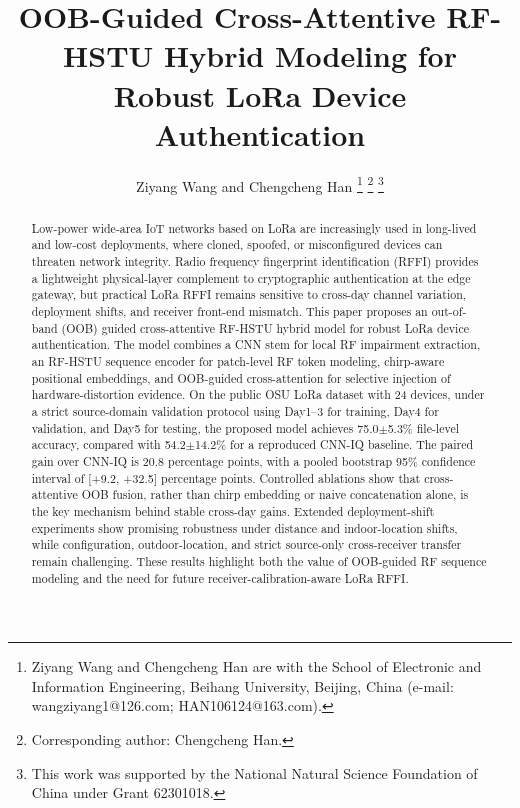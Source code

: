 \documentclass[journal]{IEEEtran}
\begin{document}
\title{OOB-Guided Cross-Attentive RF-HSTU Hybrid Modeling for Robust LoRa Device Authentication}

\author{Ziyang Wang and Chengcheng Han%
\thanks{Ziyang Wang and Chengcheng Han are with the School of Electronic and Information Engineering, Beihang University, Beijing, China (e-mail: wangziyang1@126.com; HAN106124@163.com).}
\thanks{Corresponding author: Chengcheng Han.}
\thanks{This work was supported by the National Natural Science Foundation of China under Grant 62301018.}}

\maketitle

\begin{abstract}
Low-power wide-area IoT networks based on LoRa are increasingly used in long-lived and low-cost deployments, where cloned, spoofed, or misconfigured devices can threaten network integrity.
Radio frequency fingerprint identification (RFFI) provides a lightweight physical-layer complement to cryptographic authentication at the edge gateway, but practical LoRa RFFI remains sensitive to cross-day channel variation, deployment shifts, and receiver front-end mismatch.
This paper proposes an out-of-band (OOB) guided cross-attentive RF-HSTU hybrid model for robust LoRa device authentication.
The model combines a CNN stem for local RF impairment extraction, an RF-HSTU sequence encoder for patch-level RF token modeling, chirp-aware positional embeddings, and OOB-guided cross-attention for selective injection of hardware-distortion evidence.
On the public OSU LoRa dataset with 24 devices, under a strict source-domain validation protocol using Day1--3 for training, Day4 for validation, and Day5 for testing, the proposed model achieves 75.0$\pm$5.3\% file-level accuracy, compared with 54.2$\pm$14.2\% for a reproduced CNN-IQ baseline.
The paired gain over CNN-IQ is 20.8 percentage points, with a pooled bootstrap 95\% confidence interval of [+9.2, +32.5] percentage points.
Controlled ablations show that cross-attentive OOB fusion, rather than chirp embedding or naive concatenation alone, is the key mechanism behind stable cross-day gains.
Extended deployment-shift experiments show promising robustness under distance and indoor-location shifts, while configuration, outdoor-location, and strict source-only cross-receiver transfer remain challenging.
These results highlight both the value of OOB-guided RF sequence modeling and the need for future receiver-calibration-aware LoRa RFFI.
\end{abstract}
\end{document}

